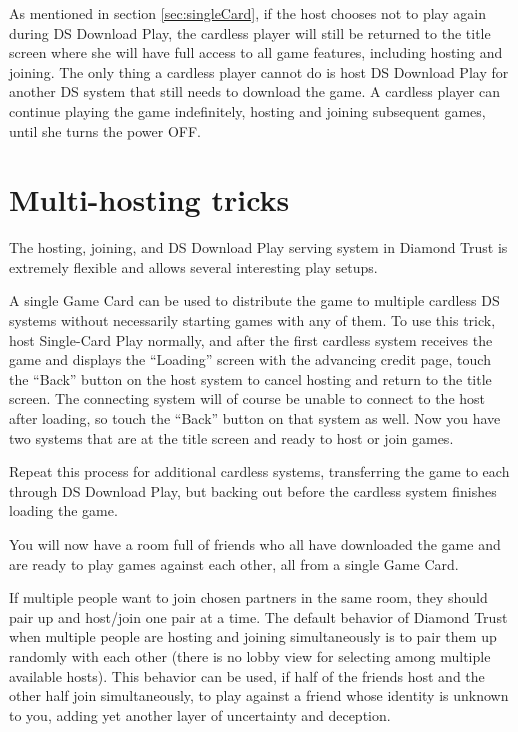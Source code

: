 \documentclass[8pt]{extbook}
\begin{document}
As mentioned in section \ref{sec:singleCard}, if the host chooses not to play again during DS Download Play, the cardless player will still be returned to the title screen where she will have full access to all game features, including hosting and joining.  The only thing a cardless player cannot do is host DS Download Play for another DS system that still needs to download the game.  A cardless player can continue playing the game indefinitely, hosting and joining subsequent games, until she turns the power OFF.


\section{Multi-hosting tricks}
\label{sec:multiHosting}
The hosting, joining, and DS Download Play serving system in Diamond Trust is extremely flexible and allows several interesting play setups.

A single Game Card can be used to distribute the game to multiple cardless DS systems without necessarily starting games with any of them.  To use this trick, host Single-Card Play normally, and after the first cardless system receives the game and displays the ``Loading'' screen with the advancing credit page, touch the ``Back'' button on the host system to cancel hosting and return to the title screen.  The connecting system will of course be unable to connect to the host after loading, so touch the ``Back'' button on that system as well.  Now you have two systems that are at the title screen and ready to host or join games.

Repeat this process for additional cardless systems, transferring the game to each through DS Download Play, but backing out before the cardless system finishes loading the game.

You will now have a room full of friends who all have downloaded the game and are ready to play games against each other, all from a single Game Card.

If multiple people want to join chosen partners in the same room, they should pair up and host/join one pair at a time.  The default behavior of Diamond Trust when multiple people are hosting and joining simultaneously is to pair them up randomly with each other (there is no lobby view for selecting among multiple available hosts).  This behavior can be used, if half of the friends host and the other half join simultaneously, to play against a friend whose identity is unknown to you, adding yet another layer of uncertainty and deception.
\end{document}
